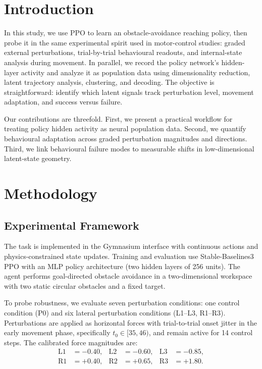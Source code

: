 
\section{Introduction}
\label{sec:introduction_revised}

In this study, we use PPO to learn an obstacle-avoidance reaching policy, then probe it in the same experimental spirit used in motor-control studies: graded external perturbations, trial-by-trial behavioural readouts, and internal-state analysis during movement. In parallel, we record the policy network's hidden-layer activity and analyze it as population data using dimensionality reduction, latent trajectory analysis, clustering, and decoding. The objective is straightforward: identify which latent signals track perturbation level, movement adaptation, and success versus failure.

Our contributions are threefold. First, we present a practical workflow for treating policy hidden activity as neural population data. Second, we quantify behavioural adaptation across graded perturbation magnitudes and directions. Third, we link behavioural failure modes to measurable shifts in low-dimensional latent-state geometry.

\section{Methodology}
\label{sec:methodology_revised}

\subsection{Experimental Framework}

The task is implemented in the Gymnasium interface with continuous actions and physics-constrained state updates. Training and evaluation use Stable-Baselines3 PPO with an MLP policy architecture (two hidden layers of 256 units). The agent performs goal-directed obstacle avoidance in a two-dimensional workspace with two static circular obstacles and a fixed target.

To probe robustness, we evaluate seven perturbation conditions: one control condition (P0) and six lateral perturbation conditions (L1--L3, R1--R3). Perturbations are applied as horizontal forces with trial-to-trial onset jitter in the early movement phase, specifically $t_0 \in [35,46)$, and remain active for 14 control steps. The calibrated force magnitudes are:
\begin{align}
\text{L1} &= -0.40, & \text{L2} &= -0.60, & \text{L3} &= -0.85, \\
\text{R1} &= +0.40, & \text{R2} &= +0.65, & \text{R3} &= +1.80.
\end{align}

